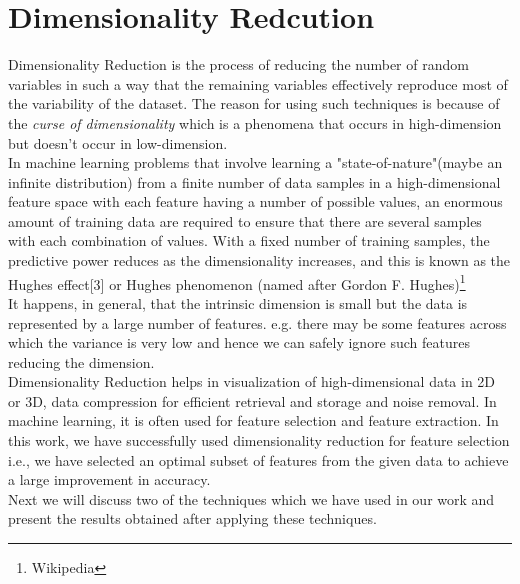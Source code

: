 \chapter{Dimensionality Redcution}
\label{sec:dimensionality_reduction}
Dimensionality Reduction is the process of reducing the number of random variables in such a way that the remaining variables effectively reproduce most of the variability of the dataset.
The reason for using such techniques is because of the \emph{curse of dimensionality} which is a phenomena that occurs in high-dimension but doesn't occur in low-dimension.\\
In machine learning problems that involve learning a "state-of-nature"(maybe an infinite distribution) from a finite number of data samples in a high-dimensional feature space with each feature having a number of possible values, an enormous amount of training data are required to ensure that there are several samples with each combination of values. With a fixed number of training samples, the predictive power reduces as the dimensionality increases, and this is known as the Hughes effect[3] or Hughes phenomenon (named after Gordon F. Hughes)\footnote{Wikipedia}\\
It happens, in general, that the intrinsic dimension is small but the data is represented by a large number of features. e.g. there may be some features across which the variance is very low and hence we can safely ignore such features reducing the dimension.\\
Dimensionality Reduction helps in visualization of high-dimensional data in 2D or 3D, data compression for efficient retrieval and storage and noise removal.
In machine learning, it is often used for feature selection and feature extraction. In this work, we have successfully used dimensionality reduction for feature selection i.e., we have selected an optimal subset of features from the given data to achieve a large improvement in accuracy.\\
Next we will discuss two of the techniques which we have used in our work and present the results obtained after applying these techniques.


